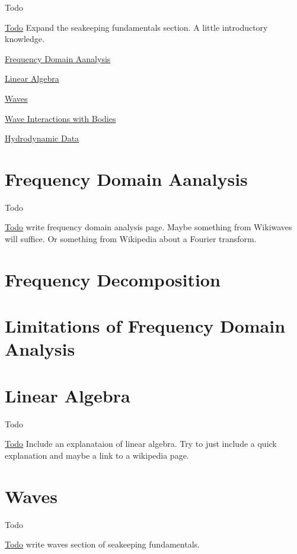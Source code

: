\begin{DoxyRefDesc}{Todo}
\item[\hyperlink{todo__todo000044}{Todo}]Expand the seakeeping fundamentals section. A little introductory knowledge.\end{DoxyRefDesc}


\hyperlink{frequency_domain_analysis}{Frequency Domain Aanalysis}

\hyperlink{linear_algebra}{Linear Algebra}

\hyperlink{waves}{Waves}

\hyperlink{wave_interactions_with_bodies}{Wave Interactions with Bodies}

\hyperlink{hydrodynamic_data}{Hydrodynamic Data} \hypertarget{frequency_domain_analysis}{}\section{Frequency Domain Aanalysis}\label{frequency_domain_analysis}
\begin{DoxyRefDesc}{Todo}
\item[\hyperlink{todo__todo000039}{Todo}]write frequency domain analysis page. Maybe something from Wikiwaves will suffice. Or something from Wikipedia about a Fourier transform.\end{DoxyRefDesc}


\section*{Frequency Decomposition}

\section*{Limitations of Frequency Domain Analysis}\hypertarget{linear_algebra}{}\section{Linear Algebra}\label{linear_algebra}
\begin{DoxyRefDesc}{Todo}
\item[\hyperlink{todo__todo000041}{Todo}]Include an explanataion of linear algebra. Try to just include a quick explanation and maybe a link to a wikipedia page.\end{DoxyRefDesc}
\hypertarget{waves}{}\section{Waves}\label{waves}
\begin{DoxyRefDesc}{Todo}
\item[\hyperlink{todo__todo000043}{Todo}]write waves section of seakeeping fundamentals.\end{DoxyRefDesc}


